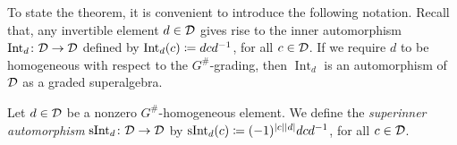 \documentclass{amsbook}
\begin{document}

To state the theorem, it is convenient to introduce the following notation. 
Recall that, any invertible element $d\in \mathcal{D}$ gives rise to the inner automorphism $\operatorname{Int}_d\colon \mathcal{D} \to \mathcal{D}$ defined by $\operatorname{Int}_d (c) \coloneqq dcd^{-1}$, for all $c\in \mathcal{D}$. 
If we require $d$ to be homogeneous with respect to the $G^\#$-grading, then $\operatorname{Int}_d$ is an automorphism of $\mathcal{D}$ as a graded superalgebra.

\begin{defi}
    Let $d\in \mathcal{D}$ be a nonzero $G^\#$-homogeneous element. 
    We define the \emph{superinner automorphism} $\operatorname{sInt}_d\colon \mathcal{D} \to \mathcal{D}$ by $\operatorname{sInt}_d (c) \coloneqq (-1)^{|c||d|} dcd^{-1}$, for all $c\in \mathcal{D}$.
\end{defi}




\end{document}
